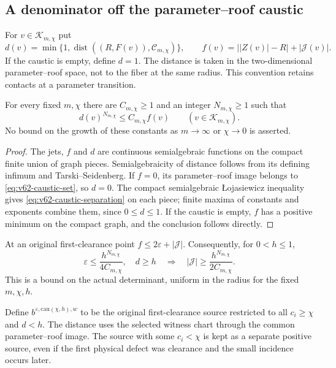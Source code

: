 \subsection{A denominator off the parameter--roof caustic}
For $v\in\mathcal K_{m,\chi}$ put
\[
 d(v)=\min\{1,\operatorname{dist}((R,F(v)),\mathcal C_{m,\chi})\},
 \qquad f(v)=\bigl||Z(v)|-R\bigr|+|\mathcal J(v)|.
\]
If the caustic is empty, define $d=1$.
The distance is taken in the two-dimensional parameter--roof space,
not to the fiber at the same radius. This convention retains contacts
at a parameter transition.

\begin{lemma}
\label{lem:v62-caustic-separation}
For every fixed $m,\chi$ there are $C_{m,\chi}\ge1$ and an integer
$N_{m,\chi}\ge1$ such that
\begin{equation}\label{eq:v62-caustic-separation}
 d(v)^{N_{m,\chi}}\le C_{m,\chi}f(v)
                          \qquad(v\in\mathcal K_{m,\chi}).
\end{equation}
No bound on the growth of these constants as $m\to\infty$ or
$\chi\to0$ is asserted.
\end{lemma}
\begin{proof}
The jets, $f$ and $d$ are continuous semialgebraic functions on the
compact finite union of graph pieces. Semialgebraicity of distance
follows from its defining infimum and Tarski--Seidenberg. If $f=0$,
its parameter--roof image belongs to \eqref{eq:v62-caustic-set}, so
$d=0$. The compact semialgebraic \L ojasiewicz inequality
\cite[Theorem 2.12]{CosteSAG} gives \eqref{eq:v62-caustic-separation}
on each piece; finite maxima of constants and exponents combine them,
since $0\le d\le1$. If the caustic is empty, $f$ has a positive
minimum on the compact graph, and the conclusion follows directly.
\end{proof}

At an original first-clearance point $f\le2\varepsilon+|\mathcal J|$.
Consequently, for $0<h\le1$,
\begin{equation}\label{eq:v62-caustic-rank}
 \varepsilon\le\frac{h^{N_{m,\chi}}}{4C_{m,\chi}},\quad d\ge h
 \quad\Longrightarrow\quad
 |\mathcal J|\ge\frac{h^{N_{m,\chi}}}{2C_{m,\chi}}.
\end{equation}
This is a bound on the actual determinant, uniform in the radius for
the fixed $m,\chi,h$.

Define $b^{\varepsilon,\mathrm{cau}(\chi,h),w}$ to be the original
first-clearance source restricted to all $c_i\ge\chi$ and $d<h$.
The distance uses the selected witness chart through the common
parameter--roof image. The source with some $c_i<\chi$ is kept as
a separate positive source, even if the first physical defect was
clearance and the small incidence occurs later.

